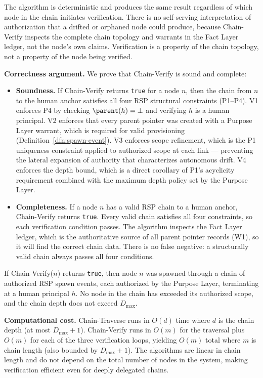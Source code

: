 The algorithm is deterministic and produces the same result regardless of which node in the chain initiates verification. There is no self-serving interpretation of authorization that a drifted or orphaned node could produce, because Chain-Verify inspects the complete chain topology and warrants in the Fact Layer ledger, not the node's own claims. Verification is a property of the chain topology, not a property of the node being verified.

\medskip
\noindent\textbf{Correctness argument.} We prove that Chain-Verify is sound and complete:

\begin{itemize}
    \item \textbf{Soundness.} If Chain-Verify returns \texttt{true} for a node $n$, then the chain from $n$ to the human anchor satisfies all four RSP structural constraints (P1–P4). V1 enforces P4 by checking $\parent(h) = \bot$ and verifying $h$ is a human principal. V2 enforces that every parent pointer was created with a Purpose Layer warrant, which is required for valid provisioning (Definition~\ref{dfn:spawn-event}). V3 enforces scope refinement, which is the P1 uniqueness constraint applied to authorized scope at each link — preventing the lateral expansion of authority that characterizes autonomous drift. V4 enforces the depth bound, which is a direct corollary of P1's acyclicity requirement combined with the maximum depth policy set by the Purpose Layer.

    \item \textbf{Completeness.} If a node $n$ has a valid RSP chain to a human anchor, Chain-Verify returns \texttt{true}. Every valid chain satisfies all four constraints, so each verification condition passes. The algorithm inspects the Fact Layer ledger, which is the authoritative source of all parent pointer records (W1), so it will find the correct chain data. There is no false negative: a structurally valid chain always passes all four conditions.
\end{itemize}

\begin{cor}
If Chain-Verify($n$) returns \texttt{true}, then node $n$ was spawned through a chain of authorized RSP spawn events, each authorized by the Purpose Layer, terminating at a human principal $h$. No node in the chain has exceeded its authorized scope, and the chain depth does not exceed $D_{\max}$.
\end{cor}

\medskip
\noindent\textbf{Computational cost.} Chain-Traverse runs in $O(d)$ time where $d$ is the chain depth (at most $D_{\max} + 1$). Chain-Verify runs in $O(m)$ for the traversal plus $O(m)$ for each of the three verification loops, yielding $O(m)$ total where $m$ is chain length (also bounded by $D_{\max} + 1$). The algorithms are linear in chain length and do not depend on the total number of nodes in the system, making verification efficient even for deeply delegated chains.

